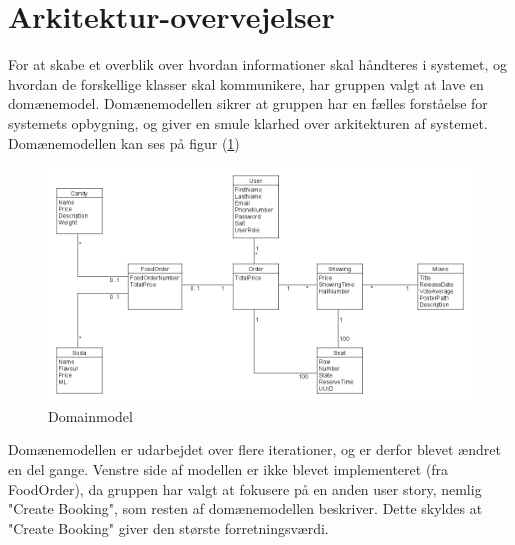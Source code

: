 \section{Arkitektur-overvejelser}\label{sec:arkitektur}
For at skabe et overblik over hvordan informationer skal håndteres i systemet,
og hvordan de forskellige klasser skal kommunikere, har gruppen valgt at lave en domænemodel.
Domænemodellen sikrer at gruppen har en fælles forståelse for systemets opbygning,
og giver en smule klarhed over arkitekturen af systemet.\\

Domænemodellen kan ses på figur (\ref{fig:domain})

\begin{figure}
    \centering
    \includegraphics[width=1\textwidth]{figures/Domainmodel.png}
    \caption{Domainmodel}
    \label{fig:domain}
\end{figure}

Domænemodellen er udarbejdet over flere iterationer, og er derfor blevet ændret en del gange.
Venstre side af modellen er ikke blevet implementeret (fra FoodOrder), da gruppen har valgt at fokusere på
en anden user story, nemlig "Create Booking", som resten af domænemodellen beskriver. Dette skyldes at "Create Booking"
giver den største forretningsværdi. 